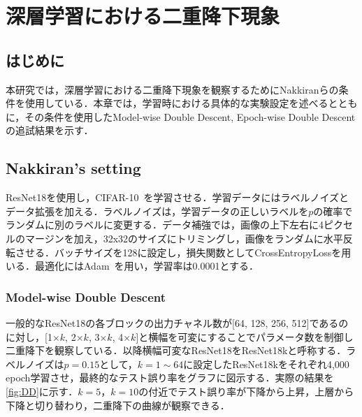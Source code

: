 \chapter{深層学習における二重降下現象}
\section{はじめに}
本研究では，深層学習における二重降下現象を観察するためにNakkiranら\cite{nakkiran2021deep}の条件を使用している．本章では，学習時における具体的な実験設定を述べるとともに，その条件を使用したModel-wise Double Descent, Epoch-wise Double Descentの追試結果を示す．

\section{Nakkiran's setting}
\label{sec:Nakkiran's setting}
ResNet18を使用し，CIFAR-10~\cite{Krizhevsky2009_cifar}を学習させる．学習データにはラベルノイズとデータ拡張を加える．ラベルノイズは，学習データの正しいラベルを$p$の確率でランダムに別のラベルに変更する．データ補強では，画像の上下左右に4ピクセルのマージンを加え，32x32のサイズにトリミングし，画像をランダムに水平反転させる．バッチサイズを128に設定し，損失関数としてCrossEntropyLossを用いる．最適化にはAdam~\cite{Adam}を用い，学習率は0.0001とする．

\subsection{Model-wise Double Descent}
一般的なResNet18の各ブロックの出力チャネル数が[64, 128, 256, 512]であるのに対し，[1$\times k$, 2$\times k$, 3$\times k$, 4$\times k$]と横幅を可変にすることでパラメータ数を制御し二重降下を観察している．以降横幅可変なResNet18をResNet18kと呼称する．ラベルノイズは$p=0.15$として，$k=1\sim64$に設定したResNet18kをそれぞれ4,000 epoch学習させ，最終的なテスト誤り率をグラフに図示する．実際の結果を\cref{fig:DD}に示す．$k=5$，$k=10$の付近でテスト誤り率が下降から上昇，上層から下降と切り替わり，二重降下の曲線が観察できる．

